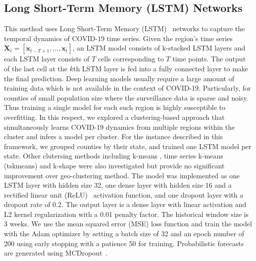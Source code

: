 \documentclass[sigconf]{acmart}
\begin{document}
\subsection{Long Short-Term Memory (LSTM) Networks}
This method uses Long Short-Term Memory (LSTM)~\cite{hochreiter1997long, wang2020examining} networks to capture the temporal dynamics of COVID-19 time series. Given the region's time series $\mathbf{X}_{t}=[\mathbf{x}_{t-T+1},...,\mathbf{x}_{t}]$, an LSTM model consists of k-stacked LSTM layers and each LSTM layer consists of $T$ cells corresponding to $T$ time points. The output of the last cell at the $k$th LSTM layer is fed into a fully connected layer to make the final prediction. Deep learning models usually require a large amount of training data which is not available in the context of COVID-19. Particularly, for counties of small population size where the surveillance data is sparse and noisy. Thus training a single model for each such region is highly susceptible to overfitting. In this respect, we explored a clustering-based approach that simultaneously learns COVID-19 dynamics from multiple regions within the cluster and infers a model per cluster. For the instance described in this framework, we grouped counties by their state, and trained one LSTM model per state. Other clutersing methods including k-means \cite{hartigan1979algorithm}, time series k-means (tskmeans) \cite{huang2016time} and k-shape \cite{paparrizos2015k} were also investigated but provide no significant improvement over geo-clustering method. 
The model was implemented as one LSTM layer with hidden size 32, one dense layer with hidden size 16 and a rectified linear unit (ReLU)~\cite{nair2010rectified} activation function, and one dropout layer with a dropout rate of 0.2. The output layer is a dense layer with linear activation and L2 kernel regularization with a 0.01 penalty factor. The historical window size is 3 weeks. We use the mean squared error (MSE) loss function and train the model with the Adam optimizer by setting a batch size of 32 and an epoch number of 200 using early stopping with a patience 50 for training. Probabilistic forecasts are generated using MCDropout~\cite{gal2016dropout}.
\end{document}
